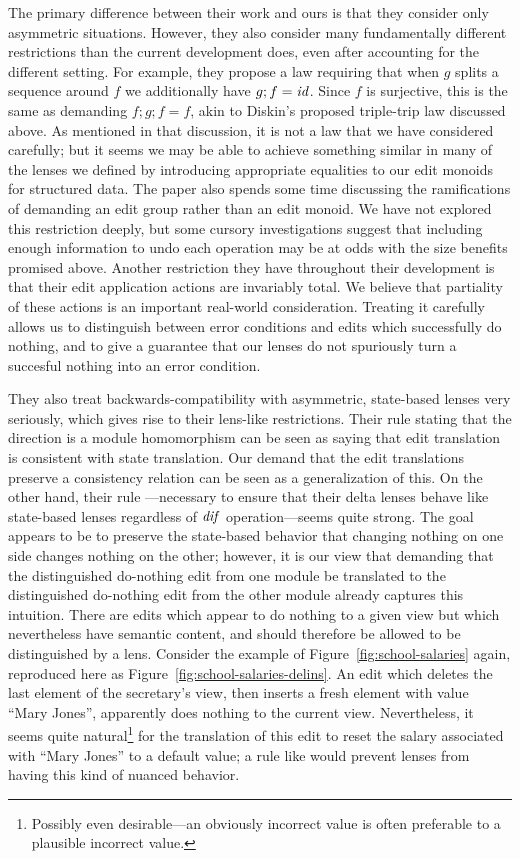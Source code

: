 The primary difference between their work and ours is that they consider
only asymmetric situations. However, they also consider many fundamentally
different restrictions than the current development does, even after
accounting for the different setting. For example, they propose a law
requiring that when $g$ splits a sequence around $f$ we additionally have
$g;f=\mathit{id}$. Since $f$ is surjective, this is the same as demanding $f;g;f=f$,
akin to Diskin's proposed triple-trip law discussed above. As mentioned in
that discussion, it is not a law that we have considered carefully; but it
seems we may be able to achieve something similar in many of the lenses we
defined by introducing appropriate equalities to our edit monoids for
structured data. The paper also spends some time discussing the
ramifications of demanding an edit group rather than an edit monoid. We have
not explored this restriction deeply, but some cursory investigations
suggest that including enough information to undo each operation may be at
odds with the size benefits promised above. Another restriction they have
throughout their development is that their edit application actions are
invariably total. We believe that partiality of these actions is an
important real-world consideration. Treating it carefully allows us to
distinguish between error conditions and edits which successfully do
nothing, and to give a guarantee that our lenses do not spuriously turn a
succesful nothing into an error condition.

They also treat backwards-compatibility with asymmetric, state-based lenses
very seriously, which gives rise to their lens-like restrictions.  Their
rule  stating that the \GET direction is a module homomorphism can
be seen as saying that edit translation is consistent with state
translation.  Our demand that the edit translations preserve a consistency
relation can be seen as a generalization of this. On the other hand, their
rule ---necessary to ensure that their delta lenses behave like
state-based lenses regardless of $\mathit{dif}$ operation---seems quite strong. The
goal appears to be to preserve the state-based behavior that changing
nothing on one side changes nothing on the other; however, it is our view
that demanding that the distinguished do-nothing edit from one module be
translated to the distinguished do-nothing edit from the other module
already captures this intuition. There are edits which appear to do nothing
to a given view but which nevertheless have semantic content, and should
therefore be allowed to be distinguished by a lens. Consider the example of
Figure~\ref{fig:school-salaries} again, reproduced here as
Figure~\ref{fig:school-salaries-delins}. An edit which deletes the last
element of the secretary's view, then inserts a fresh element with value
``Mary Jones'', apparently does nothing to the current view. Nevertheless,
it seems quite natural\footnote{Possibly even desirable---an obviously
incorrect value is often preferable to a plausible incorrect value.} for the
translation of this edit to reset the salary associated with ``Mary Jones''
to a default value; a rule like  would prevent lenses from having
this kind of nuanced behavior.

